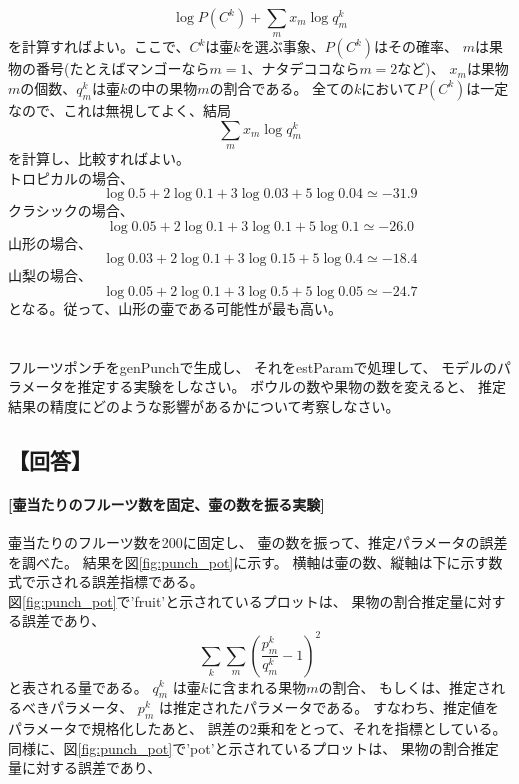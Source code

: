 \documentclass[a4j]{jarticle}
\begin{document}
\begin{equation}
\log P(C^k) + \sum_{m}x_m\log q_m^k
\end{equation}
を計算すればよい。ここで、$C^k$は壷$k$を選ぶ事象、$P(C^k)$はその確率、
$m$は果物の番号(たとえばマンゴーなら$m=1$、ナタデココなら$m=2$など)、
$x_m$は果物$m$の個数、$q_m^k$は壷$k$の中の果物$m$の割合である。
全ての$k$において$P(C^k)$は一定なので、これは無視してよく、結局
\begin{equation}
\sum_{m}x_m\log q_m^k
\end{equation}
を計算し、比較すればよい。\\
トロピカルの場合、
\begin{equation}
\log 0.5 + 2\log 0.1 + 3\log 0.03 + 5\log 0.04 \simeq -31.9
\end{equation}
クラシックの場合、
\begin{equation}
\log 0.05 + 2\log 0.1 + 3\log 0.1 + 5\log 0.1 \simeq -26.0
\end{equation}
山形の場合、
\begin{equation}
\log 0.03 + 2\log 0.1 + 3\log 0.15 + 5\log 0.4 \simeq -18.4
\end{equation}
山梨の場合、
\begin{equation}
\log 0.05 + 2\log 0.1 + 3\log 0.5 + 5\log 0.05 \simeq -24.7
\end{equation}
となる。従って、山形の壷である可能性が最も高い。

\section{}
フルーツポンチをgenPunchで生成し、
それをestParamで処理して、
モデルのパラメータを推定する実験をしなさい。
ボウルの数や果物の数を変えると、
推定結果の精度にどのような影響があるかについて考察しなさい。

\subsection{【回答】}

\paragraph{[壷当たりのフルーツ数を固定、壷の数を振る実験]}
壷当たりのフルーツ数を200に固定し、
壷の数を振って、推定パラメータの誤差を調べた。
結果を図\ref{fig:punch_pot}に示す。
横軸は壷の数、縦軸は下に示す数式で示される誤差指標である。 \\
図\ref{fig:punch_pot}で'fruit'と示されているプロットは、
果物の割合推定量に対する誤差であり、
\begin{equation}
\sum_{k} \sum_{m} (\frac{p_m^k}{q_m^k} - 1)^2
\end{equation}
と表される量である。
$q_m^k$ は壷$k$に含まれる果物$m$の割合、
もしくは、推定されるべきパラメータ、
$p_m^k$ は推定されたパラメータである。
すなわち、推定値をパラメータで規格化したあと、
誤差の2乗和をとって、それを指標としている。
同様に、図\ref{fig:punch_pot}で'pot'と示されているプロットは、
果物の割合推定量に対する誤差であり、
\end{document}
